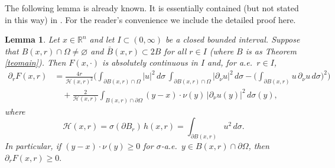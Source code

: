 \documentclass[11pt]{amsart}
\newcommand{\R}{{\mathbb R}}       %
\newcommand{\HH}{{\mathcal H}}
\newcommand{\vv}{{\vspace{2mm}}}
\newtheorem{lemma}[theorem]{Lemma}
\theoremstyle{definition}
\theoremstyle{remark}
\numberwithin{equation}{section}
\begin{document}
\vv



The following lemma is already known. It is essentially contained (but not stated in this way) in \cite{AEK}. For the reader's
convenience we include the detailed proof here.

\begin{lemma}\label{lemderiv}
Let $x\in\R^n$ and let $I\subset (0,\infty)$ be a closed bounded interval. Suppose that $B(x,r)\cap\Omega\neq\varnothing$ and $\bar B(x,r)\subset 2B$ for all $r\in I$ (where $B$ is as
Theorem \ref{teomain}). Then
$F(x,\cdot)$ is absolutely continuous in $I$ and, for a.e.\ $r\in I$,
\begin{align}\label{eqcalc}
\partial_rF(x,r) & =  
\frac{4r}{\HH(x,r)^2} \bigg(
\int_{\partial B(x,r)\cap\Omega} |u|^2\,d\sigma\,
 \int_{\partial B(x,r)\cap\Omega} \big|\partial_\nu u\big|^2\,d\sigma - \bigg(\int_{\partial B(x,r)} u\,\partial_\nu u\,d\sigma\bigg)^2\bigg)\\
 &\quad
+  \frac{2}{\HH(x,r)} \int_{B(x,r)\cap\partial\Omega} (y-x)\cdot \nu(y)\,\big|\partial_\nu u(y)\big|^2\,d\sigma(y),\nonumber
\end{align}
where
$$\HH(x,r) = \sigma(\partial B_r) \,h(x,r) = \int_{\partial B(x,r)} u^2\,d\sigma.$$
In particular, if $(y-x)\cdot \nu(y)\geq 0$ for $\sigma$-a.e.\ $y\in B(x,r)\cap\partial\Omega$, 
then $\partial_r F(x,r)\geq0.$
\end{lemma}
\end{document}
